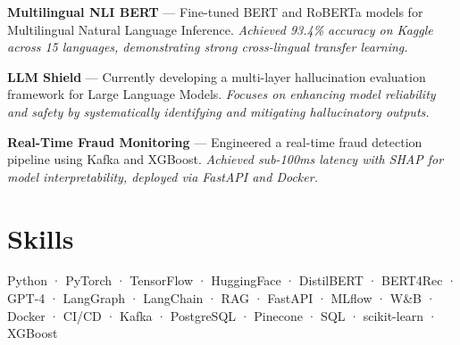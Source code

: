 \documentclass[10.5pt,letterpaper]{article}
\begin{document}
\textbf{Multilingual NLI BERT} — Fine-tuned BERT and RoBERTa models for Multilingual Natural Language Inference. \textit{Achieved 93.4\% accuracy on Kaggle across 15 languages, demonstrating strong cross-lingual transfer learning.}

\textbf{LLM Shield} — Currently developing a multi-layer hallucination evaluation framework for Large Language Models. \textit{Focuses on enhancing model reliability and safety by systematically identifying and mitigating hallucinatory outputs.}

\textbf{Real-Time Fraud Monitoring} — Engineered a real-time fraud detection pipeline using Kafka and XGBoost. \textit{Achieved sub-100ms latency with SHAP for model interpretability, deployed via FastAPI and Docker.}

\section{Skills}
Python · PyTorch · TensorFlow · HuggingFace · DistilBERT · BERT4Rec · GPT-4 · LangGraph · LangChain · RAG · FastAPI · MLflow · W\&B · Docker · CI/CD · Kafka · PostgreSQL · Pinecone · SQL · scikit-learn · XGBoost
\end{document}
